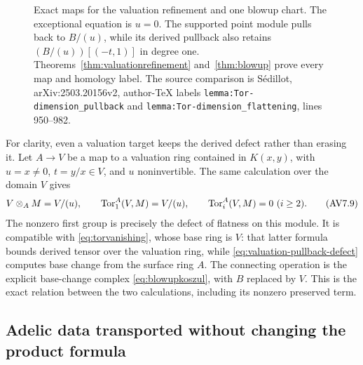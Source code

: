 \begin{figure}[ht]
\centering
{}
\caption{Exact maps for the valuation refinement and one blowup chart.
The exceptional equation is $u=0$. The supported point module pulls
back to $B/(u)$, while its derived pullback also retains
$(B/(u))[(-t,1)]$ in degree one. Theorems~\ref{thm:valuationrefinement}
and~\ref{thm:blowup} prove every map and homology label. The source
comparison is S\'edillot, arXiv:2503.20156v2, author-TeX labels
\nolinkurl{lemma:Tor-dimension_pullback} and
\nolinkurl{lemma:Tor-dimension_flattening}, lines 950--982.}
\end{figure}

For clarity, even a valuation target keeps the derived defect rather
than erasing it. Let $A\to V$ be a map to a valuation ring contained in
$K(x,y)$, with $u=x\ne0$, $t=y/x\in V$, and $u$ noninvertible. The same
calculation over the domain $V$ gives
\[
 V\otimes_A M=V/(u),\qquad
 \operatorname{Tor}_1^A(V,M)=V/(u),\qquad \operatorname{Tor}_i^A(V,M)=0\ (i\ge2).
 \tag{AV7.9}\label{eq:valuation-pullback-defect}
\]
The nonzero first group is precisely the defect of flatness on this
module. It is compatible with \eqref{eq:torvanishing}, whose base ring
is $V$: that latter formula bounds derived tensor over the valuation
ring, while \eqref{eq:valuation-pullback-defect} computes base change
from the surface ring $A$. The connecting operation is the explicit
base-change complex \eqref{eq:blowupkoszul}, with $B$ replaced by $V$.
This is the exact relation between the two calculations, including its
nonzero preserved term.

\subsection{Adelic data transported without changing the product formula}

